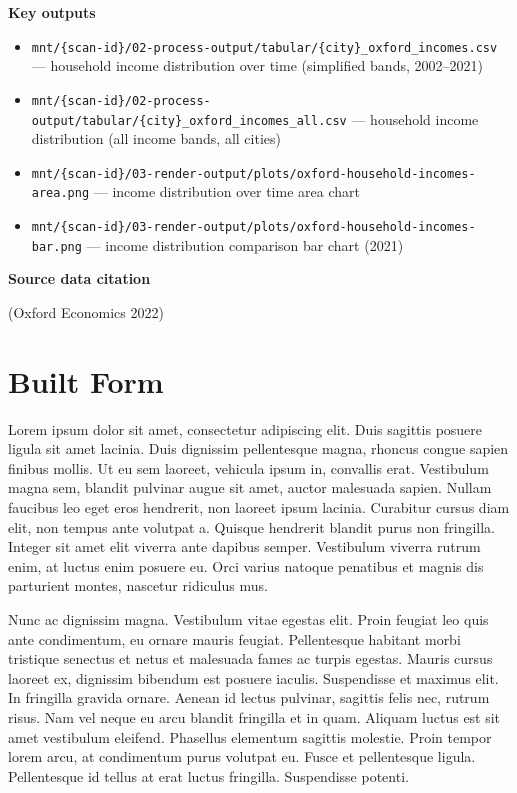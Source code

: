 \documentclass[
  letterpaper,
  DIV=11,
  numbers=noendperiod]{scrreprt}
\providecommand{\tightlist}{%
  \setlength{\itemsep}{0pt}\setlength{\parskip}{0pt}}
\begin{document}
\textbf{Key outputs}

\begin{itemize}
\tightlist
\item
  \texttt{mnt/\{scan-id\}/02-process-output/tabular/\{city\}\_oxford\_incomes.csv}
  --- household income distribution over time (simplified bands,
  2002--2021)
\item
  \texttt{mnt/\{scan-id\}/02-process-output/tabular/\{city\}\_oxford\_incomes\_all.csv}
  --- household income distribution (all income bands, all cities)
\item
  \texttt{mnt/\{scan-id\}/03-render-output/plots/oxford-household-incomes-area.png}
  --- income distribution over time area chart
\item
  \texttt{mnt/\{scan-id\}/03-render-output/plots/oxford-household-incomes-bar.png}
  --- income distribution comparison bar chart (2021)
\end{itemize}

\textbf{Source data citation}

(Oxford Economics 2022)

\chapter{Built Form}\label{built-form}

Lorem ipsum dolor sit amet, consectetur adipiscing elit. Duis sagittis
posuere ligula sit amet lacinia. Duis dignissim pellentesque magna,
rhoncus congue sapien finibus mollis. Ut eu sem laoreet, vehicula ipsum
in, convallis erat. Vestibulum magna sem, blandit pulvinar augue sit
amet, auctor malesuada sapien. Nullam faucibus leo eget eros hendrerit,
non laoreet ipsum lacinia. Curabitur cursus diam elit, non tempus ante
volutpat a. Quisque hendrerit blandit purus non fringilla. Integer sit
amet elit viverra ante dapibus semper. Vestibulum viverra rutrum enim,
at luctus enim posuere eu. Orci varius natoque penatibus et magnis dis
parturient montes, nascetur ridiculus mus.

Nunc ac dignissim magna. Vestibulum vitae egestas elit. Proin feugiat
leo quis ante condimentum, eu ornare mauris feugiat. Pellentesque
habitant morbi tristique senectus et netus et malesuada fames ac turpis
egestas. Mauris cursus laoreet ex, dignissim bibendum est posuere
iaculis. Suspendisse et maximus elit. In fringilla gravida ornare.
Aenean id lectus pulvinar, sagittis felis nec, rutrum risus. Nam vel
neque eu arcu blandit fringilla et in quam. Aliquam luctus est sit amet
vestibulum eleifend. Phasellus elementum sagittis molestie. Proin tempor
lorem arcu, at condimentum purus volutpat eu. Fusce et pellentesque
ligula. Pellentesque id tellus at erat luctus fringilla. Suspendisse
potenti.
\end{document}
